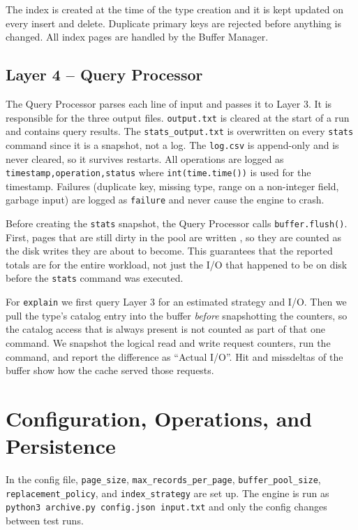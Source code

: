 \documentclass[12pt]{article}
\begin{document}
The index is created at the time of the type creation and it is kept updated on
every insert and delete. Duplicate primary keys are rejected before
anything is changed. All index pages are handled by the Buffer Manager.

\subsection{Layer 4 -- Query Processor}

The Query Processor parses each line of input and passes it to Layer 3. It is responsible for 
the three output files. \texttt{output.txt} is cleared at the start of
a run and contains query results. The \texttt{stats\_output.txt} is overwritten on
every \texttt{stats} command since it is a snapshot, not a log.
The \texttt{log.csv} is append-only and is never cleared, so it survives
restarts. All operations are logged as \texttt{timestamp,operation,status}
where \texttt{int(time.time())} is used for the timestamp. Failures (duplicate key,
missing type, range on a non-integer field, garbage input) are logged as
\texttt{failure} and never cause the engine to crash.

Before creating the \texttt{stats} snapshot, the Query Processor calls
\texttt{buffer.flush()}. First, pages that are still dirty in the pool are written
, so they are counted as the disk writes they are about to become.
This guarantees that the reported totals are for the entire workload, not just the
I/O that happened to be on disk before the \texttt{stats} command was executed.

For \texttt{explain} we first query Layer 3 for an estimated strategy and
I/O. Then we pull the type's catalog entry into the buffer \emph{before}
snapshotting the counters, so the catalog access that is always present is not
counted as part of that one command. We snapshot the logical read and
write request counters, run the command, and report the difference as
``Actual I/O''. Hit and missdeltas of the buffer show how the cache served
those requests.

\section{Configuration, Operations, and Persistence}

In the config file, \texttt{page\_size}, \texttt{max\_records\_per\_page},
\texttt{buffer\_pool\_size}, \texttt{replacement\_policy}, and
\texttt{index\_strategy} are set up. The engine is run as
\texttt{python3 archive.py config.json input.txt} and only the config
changes between test runs.
\end{document}
